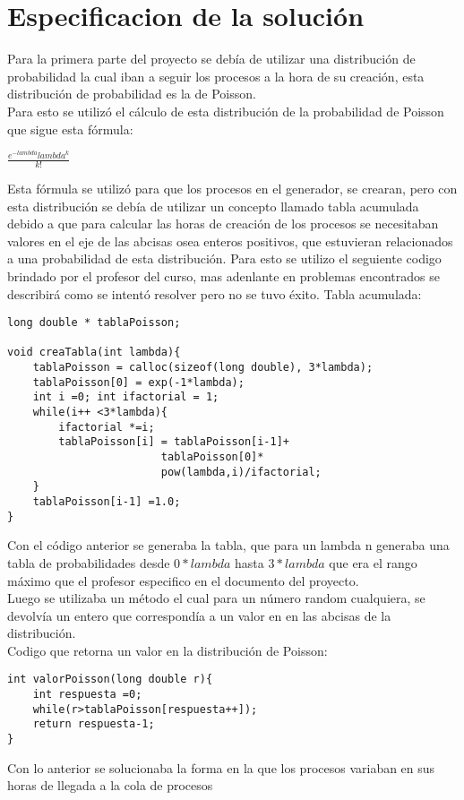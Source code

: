 \documentclass[10pt,a4paper]{article}
\begin{document}
\section{Especificacion de la solución}
Para la primera parte del proyecto se debía de utilizar una distribución de probabilidad la cual iban a seguir los procesos a la hora de su creación, esta distribución de probabilidad es la de Poisson.\\
Para esto se utilizó el cálculo de esta distribución de la probabilidad de Poisson que sigue esta fórmula:
\linebreak
\linebreak
\begin{center}
$\frac{e^{-lambda}lambda^k}{k!}$\\
\end{center} 	
Esta fórmula se utilizó para que los procesos en el generador, se crearan, pero con esta distribución se debía de utilizar un concepto llamado tabla acumulada debido a que para calcular las horas de creación de los procesos se necesitaban valores en el eje de las abcisas osea enteros positivos, que estuvieran relacionados a una probabilidad de esta distribución. 
Para esto se utilizo el seguiente codigo brindado por el profesor del curso, mas adenlante en problemas encontrados se describirá como se intentó resolver pero no se tuvo éxito. 
Tabla acumulada:\\
\begin{verbatim}
long double * tablaPoisson;

void creaTabla(int lambda){
    tablaPoisson = calloc(sizeof(long double), 3*lambda);
    tablaPoisson[0] = exp(-1*lambda);
    int i =0; int ifactorial = 1;
    while(i++ <3*lambda){
        ifactorial *=i;
        tablaPoisson[i] = tablaPoisson[i-1]+
                        tablaPoisson[0]*
                        pow(lambda,i)/ifactorial;
    }
    tablaPoisson[i-1] =1.0;
}
\end{verbatim}
Con el código anterior se generaba la tabla, que para un lambda n generaba una tabla de probabilidades desde $0*lambda$ hasta 
$3*lambda$ que era el rango máximo que el profesor especifico en 
el documento del proyecto.\\
Luego se utilizaba un método el cual para un número random cualquiera, se devolvía un entero que correspondía a un valor en
en las abcisas de la distribución.\\ 
Codigo que retorna un valor en la distribución de Poisson:
\begin{verbatim}
int valorPoisson(long double r){
    int respuesta =0;
    while(r>tablaPoisson[respuesta++]);
    return respuesta-1;   
}
\end{verbatim}
Con lo anterior se solucionaba la forma en la que los procesos variaban en sus horas de llegada a la cola de procesos 
\pagebreak
\end{document}
